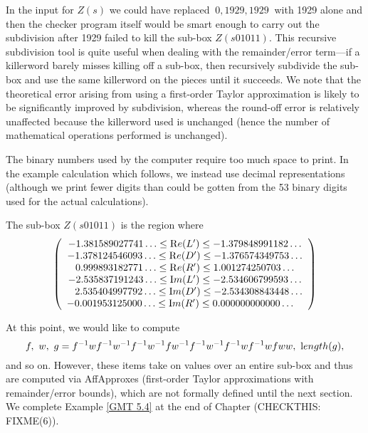 \begin{example}
 


In the input for $Z(s)$ we could have
replaced 
 $\ 0, 1929, 1929\ $ with 1929 alone
and then the checker
program itself would be smart enough to carry out
the subdivision after 1929 failed to kill the sub-box
$Z(s01011).$
This recursive subdivision tool is quite useful when dealing with the 
remainder/error term---if a killerword barely misses killing off a sub-box, then recursively subdivide the sub-box and
use the same killerword on the pieces until it succeeds.   We note that the theoretical error arising from using a
first-order Taylor approximation is likely to be significantly improved by subdivision, whereas the
round-off error is relatively unaffected because the killerword
used is unchanged (hence the number of mathematical operations
performed is unchanged).

The binary numbers used by the computer require too much space to print.
In the example calculation which follows, we instead use decimal 
representations (although we print fewer digits than could
be gotten from the 53 binary digits used for the actual calculations).

The sub-box $Z(s01011)$ is the region where 
$$\left(\begin{array}{c} 
-1.381589027741\ldots  \le  {\mathrm Re}(L')  \le  -1.379848991182\ldots\cr
-1.378124546093\ldots  \le  {\mathrm Re}(D')  \le  -1.376574349753\ldots\cr
0.999893182771\ldots  \le {\mathrm Re}(R')  \le  1.001274250703\ldots\cr
-2.535837191243\ldots  \le  {\mathrm Im}(L')  \le  -2.534606799593\ldots\cr
\phantom{-}2.535404997792\ldots  \le  {\mathrm Im}(D')  \le  -2.534308843448\ldots\cr
-0.001953125000\ldots  \le  {\mathrm Im}(R')  \le  0.000000000000\ldots\phantom{-}\cr
\end{array}\right)$$


At this point, we would like to compute $$f,\ w,\ g = f^{-1}wf^{-1}w^{-1}f^{-1}w^{-1}fw^{-1}f^{-1}w^{-1}f^{-1}wf^{-1}wfww, \ {\textrm length}(g),$$ 
\noindent 
and so on.  
However, these items take on values over an entire sub-box and thus are computed via AffApproxes (first-order Taylor
approximations with remainder/error bounds), which are not formally defined until the next section.  We
complete
Example \ref{GMT 5.4}
 at the end of 
	Chapter (CHECKTHIS: FIXME(6)).  %
\end{example}

